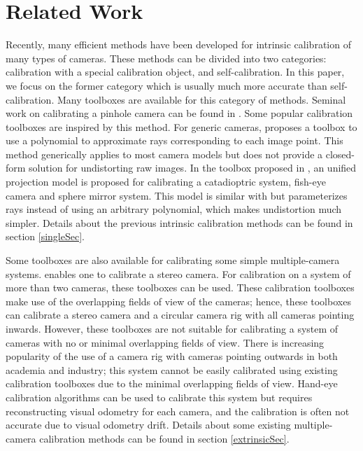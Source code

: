 \documentclass{report}
\begin{document}
\section{Related Work}
Recently, many efficient methods have been developed for intrinsic calibration of many types of cameras. These methods can be divided into two categories: calibration with a special calibration object, and self-calibration. In this paper, we focus on the former category which is usually much more accurate than self-calibration. Many toolboxes are available for this category of methods. Seminal work on calibrating a pinhole camera can be found in \cite{zhang2000flexible}. Some popular calibration toolboxes \cite{bouguet2004camera,stoyanov2006camera, opencv_library} are inspired by this method. For generic cameras, \cite{scaramuzza2006toolbox} proposes a toolbox to use a polynomial to approximate rays corresponding to each image point. This method generically applies to most camera models but does not provide a closed-form solution for undistorting raw images. In the toolbox proposed in \cite{mei2007single}, an unified projection model is proposed for calibrating a catadioptric system, fish-eye camera and sphere mirror system. This model is similar with \cite{scaramuzza2006toolbox} but parameterizes rays instead of using an arbitrary polynomial, which makes undistortion much simpler. Details about the previous intrinsic calibration methods can be found in section \ref{singleSec}. 

Some toolboxes are also available for calibrating some simple multiple-camera systems. \cite{bouguet2004camera, opencv_library} enables one to calibrate a stereo camera. For calibration on a system of more than two cameras, these toolboxes \cite{svoboda2005convenient,easycal} can be used. These calibration toolboxes make use of the overlapping fields of view of the cameras; hence, these toolboxes can calibrate a stereo camera and a circular camera rig with all cameras pointing inwards. However, these toolboxes are not suitable for calibrating a system of cameras with no or minimal overlapping fields of view. There is increasing popularity of the use of a camera rig with cameras pointing outwards in both academia and industry; this system cannot be easily calibrated using existing calibration toolboxes due to the minimal overlapping fields of view. Hand-eye calibration algorithms \cite{tsai1989new,shiu1989calibration} can be used to calibrate this system but requires reconstructing visual odometry for each camera, and the calibration is often not accurate due to visual odometry drift. Details about some existing multiple-camera calibration methods can be found in section \ref{extrinsicSec}. 
\end{document}
